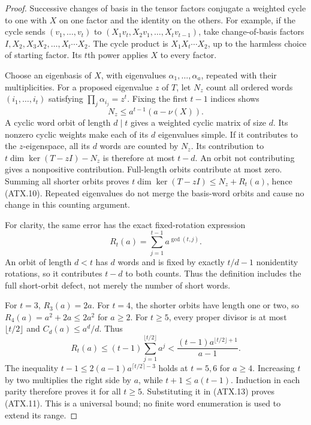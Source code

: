 \begin{proof}
Successive changes of basis in the tensor factors conjugate a
weighted cycle to one with $X$ on one factor and the identity on
the others.  For example, if the cycle sends
$(v_1,\ldots,v_t)$ to $(X_1v_t,X_2v_1,\ldots,X_tv_{t-1})$,
take change-of-basis factors $I,X_2,X_3X_2,\ldots,X_t\cdots X_2$.
The cycle product is $X_1X_t\cdots X_2$, up to the harmless
choice of starting factor.  Its $t$th power applies $X$ to every
factor.

Choose an eigenbasis of $X$, with eigenvalues
$\alpha_1,\ldots,\alpha_a$, repeated with their multiplicities.
For a proposed eigenvalue $z$ of $T$, let $N_z$ count all ordered
words $(i_1,\ldots,i_t)$ satisfying
$\prod_j\alpha_{i_j}=z^t$.  Fixing the first $t-1$ indices shows
\[
                          N_z\le a^{t-1}(a-\nu(X)).
 \tag{ATX.12}
\]
A cyclic word orbit of length $d\mid t$ gives a weighted cyclic
matrix of size $d$.  Its nonzero cyclic weights make each of its
$d$ eigenvalues simple.  If it contributes to the $z$-eigenspace,
all its $d$ words are counted by $N_z$.  Its contribution to
$t\dim\ker(T-zI)-N_z$ is therefore at most $t-d$.
An orbit not contributing gives a nonpositive contribution.
Full-length orbits contribute at most zero.  Summing all shorter
orbits proves
$t\dim\ker(T-zI)\le N_z+R_t(a)$, hence (ATX.10).
Repeated eigenvalues do not merge the basis-word orbits and
cause no change in this counting argument.

For clarity, the same error has the exact fixed-rotation expression
\[
                    R_t(a)=\sum_{j=1}^{t-1}a^{\gcd(t,j)}.
 \tag{ATX.19}
\]
An orbit of length $d<t$ has $d$ words and is fixed by exactly
$t/d-1$ nonidentity rotations, so it contributes $t-d$ to both
counts.  Thus the definition includes the full short-orbit defect,
not merely the number of short words.

For $t=3$, $R_3(a)=2a$.  For $t=4$, the shorter orbits have
length one or two, so $R_4(a)=a^2+2a\le2a^2$ for $a\ge2$.
For $t\ge5$, every proper divisor is at most $\lfloor t/2\rfloor$
and $C_d(a)\le a^d/d$.  Thus
\[
 R_t(a)\le(t-1)\sum_{j=1}^{\lfloor t/2\rfloor}a^j
       <\frac{(t-1)a^{\lfloor t/2\rfloor+1}}{a-1}.
 \tag{ATX.13}
\]
The inequality
$t-1\le2(a-1)a^{\lceil t/2\rceil-3}$ holds at $t=5,6$
for $a\ge4$.  Increasing $t$ by two multiplies the right side
by $a$, while $t+1\le a(t-1)$.  Induction in each parity
therefore proves it for all $t\ge5$.  Substituting it in
(ATX.13) proves (ATX.11).  This is a universal bound; no finite
word enumeration is used to extend its range.
\end{proof}

